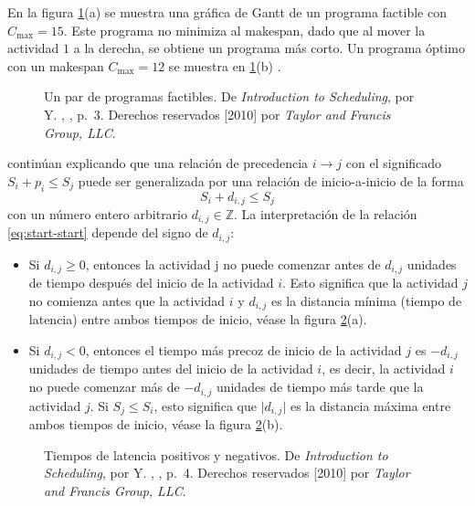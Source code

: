 \documentclass[spanish,draft,12pt,headsepline,footsepline,paper=letter]{scrreprt}
\begin{document}
En la figura \ref{fig:feasible_schedules}(a) se muestra una gráfica de Gantt de un programa factible con $C_{\max}=15$. Este programa no minimiza al makespan, dado que al mover la actividad $1$ a la derecha, se obtiene un programa más corto. Un programa óptimo con un makespan $C_{\max}=12$ se muestra en \ref{fig:feasible_schedules}(b) \citep[p.~3]{Robert2010}.

\begin{figure}[hbtp]
\centering

\caption[Programas factibles]{Un par de programas factibles. De \textit{Introduction to Scheduling}, por Y. \citeauthor{Robert2010}, \citeyear{Robert2010}, p.~3. Derechos reservados [2010] por \textit{Taylor and Francis Group, LLC}.}
\label{fig:feasible_schedules}
\end{figure}

\citet{Robert2010} continúan explicando que una relación de precedencia $i \to j$ con el significado $S_i+p_i \leq S_j$ puede ser generalizada por una relación de inicio-a-inicio de la forma 
\begin{equation} 
S_i + d_{i,j} \leq S_j 
\label{eq:start-start}
\end{equation}
con un número entero arbitrario $d_{i,j} \in \mathbb{Z}$. La interpretación de la relación \ref{eq:start-start} depende del signo de $d_{i,j}$:

\begin{itemize}
  \item Si $d_{i,j} \geq 0$, entonces la actividad j no puede comenzar antes de $d_{i,j}$ unidades de tiempo después del inicio de la actividad $i$. Esto significa que la actividad $j$ no comienza antes que la actividad $i$ y $d_{i,j}$ es la distancia mínima (tiempo de latencia) entre ambos tiempos de inicio, véase la figura \ref{fig:time-lags}(a).
  \item Si $d_{i,j} < 0$, entonces el tiempo más precoz de inicio de la actividad $j$ es $-d_{i,j}$ unidades de tiempo antes del inicio de la actividad $i$, es decir, la actividad $i$ no puede comenzar más de $-d_{i,j}$ unidades de tiempo más tarde que la actividad $j$. Si $S_j \leq S_i$, esto significa que $\lvert d_{i,j} \lvert$ es la distancia máxima entre ambos tiempos de inicio, véase la figura \ref{fig:time-lags}(b).
\end{itemize}

\begin{figure}[hbtp]
  \centering
  
  \caption[Tiempos de latencia]{Tiempos de latencia positivos y negativos. De \textit{Introduction to Scheduling}, por Y. \citeauthor{Robert2010}, \citeyear{Robert2010}, p.~4. Derechos reservados [2010] por \textit{Taylor and Francis Group, LLC}.}
  \label{fig:time-lags}
\end{figure}
\end{document}
